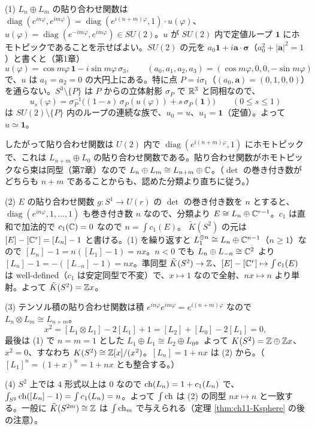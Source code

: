 \begin{solution}
(1) $L_n\oplus L_m$ の貼り合わせ関数は $\operatorname{diag}(e^{in\varphi},e^{im\varphi})=\operatorname{diag}(e^{i(n+m)\varphi},1)\cdot u(\varphi)$、$u(\varphi)=\operatorname{diag}(e^{-im\varphi},e^{im\varphi})\in SU(2)$。$u$ が $SU(2)$ 内で定値ループ $\mathbf 1$ にホモトピックであることを示せばよい。$SU(2)$ の元を $a_0\mathbf 1+i\bm a\cdot\bm\sigma$（$a_0^2+\lvert\bm a\rvert^2=1$）と書くと（第1章）
\[
u(\varphi)=\cos m\varphi\,\mathbf 1-i\sin m\varphi\,\sigma_3,\qquad (a_0,a_1,a_2,a_3)=(\cos m\varphi,0,0,-\sin m\varphi)
\]
で、$u$ は $a_1=a_2=0$ の大円上にある。特に点 $P=i\sigma_1$（$(a_0,\bm a)=(0,1,0,0)$）を通らない。$S^3\setminus\{P\}$ は $P$ からの立体射影 $\sigma_P$ で $\mathbb{R}^3$ と同相なので、
\[
u_s(\varphi)=\sigma_P^{-1}\bigl((1-s)\,\sigma_P(u(\varphi))+s\,\sigma_P(\mathbf 1)\bigr)\qquad(0\le s\le1)
\]
は $SU(2)\setminus\{P\}$ 内のループの連続な族で、$u_0=u$、$u_1=\mathbf 1$（定値）。よって $u\simeq\mathbf 1$。

したがって貼り合わせ関数は $U(2)$ 内で $\operatorname{diag}(e^{i(n+m)\varphi},1)$ にホモトピックで、これは $L_{n+m}\oplus L_0$ の貼り合わせ関数である。貼り合わせ関数がホモトピックなら束は同型（第7章）なので $L_n\oplus L_m\cong L_{n+m}\oplus\mathbb{C}$。（$\det$ の巻き付き数がどちらも $n+m$ であることからも、認めた分類より直ちに従う。）

(2) $E$ の貼り合わせ関数 $g\colon S^1\to U(r)$ の $\det$ の巻き付き数を $n$ とすると、$\operatorname{diag}(e^{in\varphi},1,\dots,1)$ も巻き付き数 $n$ なので、分類より $E\cong L_n\oplus\mathbb{C}^{r-1}$。$c_1$ は直和で加法的で $c_1(\mathbb{C})=0$ なので $n=\int c_1(E)$。
$\tilde K(S^2)$ の元は $[E]-[\mathbb{C}^r]=[L_n]-1$ と書ける。(1) を繰り返すと $L_1^{\oplus n}\cong L_n\oplus\mathbb{C}^{n-1}$（$n\ge1$）なので $[L_n]-1=n([L_1]-1)=nx$。$n<0$ でも $L_n\oplus L_{-n}\cong\mathbb{C}^2$ より $[L_n]-1=-([L_{-n}]-1)=nx$。準同型 $\tilde K(S^2)\to\mathbb{Z}$、$[E]-[\mathbb{C}^r]\mapsto\int c_1(E)$ は well-defined（$c_1$ は安定同型で不変）で、$x\mapsto1$ なので全射、$nx\mapsto n$ より単射。よって $\tilde K(S^2)=\mathbb{Z} x$。

(3) テンソル積の貼り合わせ関数は積 $e^{in\varphi}e^{im\varphi}=e^{i(n+m)\varphi}$ なので $L_n\otimes L_m\cong L_{n+m}$。
\[
x^2=[L_1\otimes L_1]-2[L_1]+1=[L_2]+[L_0]-2[L_1]=0,
\]
最後は (1) で $n=m=1$ とした $L_1\oplus L_1\cong L_2\oplus L_0$。よって $K(S^2)=\mathbb{Z}\oplus\mathbb{Z} x$、$x^2=0$、すなわち $K(S^2)\cong\mathbb{Z}[x]/(x^2)$。$[L_n]=1+nx$ は (2) から。（$[L_1]^n=(1+x)^n=1+nx$ とも整合する。）

(4) $S^2$ 上では $4$ 形式以上は $0$ なので $\operatorname{ch}(L_n)=1+c_1(L_n)$ で、$\int_{S^2}\operatorname{ch}([L_n]-1)=\int c_1(L_n)=n$。よって $\int\operatorname{ch}$ は (2) の同型 $nx\mapsto n$ と一致する。一般に $\tilde K(S^{2m})\cong\mathbb{Z}$ は $\int\operatorname{ch}_m$ で与えられる（定理 \ref{thm:ch11-Ksphere} の後の注意）。


\end{solution}
